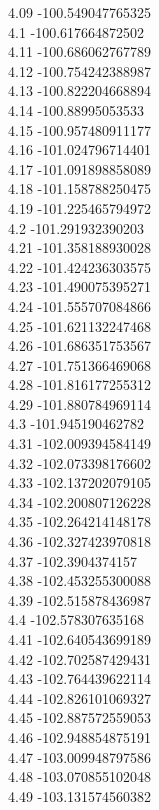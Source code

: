 {4.09	-100.549047765325\\
4.1	-100.617664872502\\
4.11	-100.686062767789\\
4.12	-100.754242388987\\
4.13	-100.822204668894\\
4.14	-100.88995053533\\
4.15	-100.957480911177\\
4.16	-101.024796714401\\
4.17	-101.091898858089\\
4.18	-101.158788250475\\
4.19	-101.225465794972\\
4.2	-101.291932390203\\
4.21	-101.358188930028\\
4.22	-101.424236303575\\
4.23	-101.490075395271\\
4.24	-101.555707084866\\
4.25	-101.621132247468\\
4.26	-101.686351753567\\
4.27	-101.751366469068\\
4.28	-101.816177255312\\
4.29	-101.880784969114\\
4.3	-101.945190462782\\
4.31	-102.009394584149\\
4.32	-102.073398176602\\
4.33	-102.137202079105\\
4.34	-102.200807126228\\
4.35	-102.264214148178\\
4.36	-102.327423970818\\
4.37	-102.3904374157\\
4.38	-102.453255300088\\
4.39	-102.515878436987\\
4.4	-102.578307635168\\
4.41	-102.640543699189\\
4.42	-102.702587429431\\
4.43	-102.764439622114\\
4.44	-102.826101069327\\
4.45	-102.887572559053\\
4.46	-102.948854875191\\
4.47	-103.009948797586\\
4.48	-103.070855102048\\
4.49	-103.131574560382\\
}
